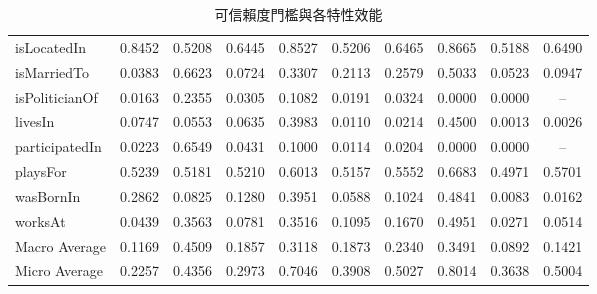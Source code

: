 \begin{table}[htbp]
\begin{tabular}{|l||c|c|c||c|c|c||c|c|c|}
isLocatedIn & 0.8452 & 0.5208 & 0.6445 & 0.8527 & 0.5206 & 0.6465 & 0.8665 & 0.5188 & 0.6490 \\
isMarriedTo & 0.0383 & 0.6623 & 0.0724 & 0.3307 & 0.2113 & 0.2579 & 0.5033 & 0.0523 & 0.0947 \\
isPoliticianOf & 0.0163 & 0.2355 & 0.0305 & 0.1082 & 0.0191 & 0.0324 & 0.0000 & 0.0000 & -- \\
livesIn & 0.0747 & 0.0553 & 0.0635 & 0.3983 & 0.0110 & 0.0214 & 0.4500 & 0.0013 & 0.0026 \\
participatedIn & 0.0223 & 0.6549 & 0.0431 & 0.1000 & 0.0114 & 0.0204 & 0.0000 & 0.0000 & -- \\
playsFor & 0.5239 & 0.5181 & 0.5210 & 0.6013 & 0.5157 & 0.5552 & 0.6683 & 0.4971 & 0.5701 \\
wasBornIn & 0.2862 & 0.0825 & 0.1280 & 0.3951 & 0.0588 & 0.1024 & 0.4841 & 0.0083 & 0.0162 \\
worksAt & 0.0439 & 0.3563 & 0.0781 & 0.3516 & 0.1095 & 0.1670 & 0.4951 & 0.0271 & 0.0514 \\
\hline
Macro Average & 0.1169 & 0.4509 & 0.1857 & 0.3118 & 0.1873 & 0.2340 & 0.3491 & 0.0892 & 0.1421 \\
Micro Average & 0.2257 & 0.4356 & 0.2973 & 0.7046 & 0.3908 & 0.5027 & 0.8014 & 0.3638 & 0.5004 \\
\hline
\end{tabular}
\caption{可信賴度門檻與各特性效能}
\label{t:reliability}
\end{table}

